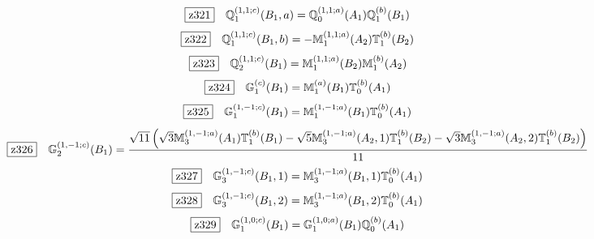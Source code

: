\documentclass[fleqn,10pt,landscape]{jsarticle}
\begin{document}
\begin{dmath*}
\hspace*{3mm}\fbox{z321}\quad \mathbb{Q}_{1}^{(1,1;c)}(B_{1},a)=\mathbb{Q}_{0}^{(1,1;a)}(A_{1}) \mathbb{Q}_{1}^{(b)}(B_{1})
\end{dmath*}
\begin{dmath*}
\hspace*{3mm}\fbox{z322}\quad \mathbb{Q}_{1}^{(1,1;c)}(B_{1},b)=- \mathbb{M}_{1}^{(1,1;a)}(A_{2}) \mathbb{T}_{1}^{(b)}(B_{2})
\end{dmath*}
\begin{dmath*}
\hspace*{3mm}\fbox{z323}\quad \mathbb{Q}_{2}^{(1,1;c)}(B_{1})=\mathbb{M}_{1}^{(1,1;a)}(B_{2}) \mathbb{M}_{1}^{(b)}(A_{2})
\end{dmath*}
\begin{dmath*}
\hspace*{3mm}\fbox{z324}\quad \mathbb{G}_{1}^{(c)}(B_{1})=\mathbb{M}_{1}^{(a)}(B_{1}) \mathbb{T}_{0}^{(b)}(A_{1})
\end{dmath*}
\begin{dmath*}
\hspace*{3mm}\fbox{z325}\quad \mathbb{G}_{1}^{(1,-1;c)}(B_{1})=\mathbb{M}_{1}^{(1,-1;a)}(B_{1}) \mathbb{T}_{0}^{(b)}(A_{1})
\end{dmath*}
\begin{dmath*}
\hspace*{3mm}\fbox{z326}\quad \mathbb{G}_{2}^{(1,-1;c)}(B_{1})=\frac{\sqrt{11} \left(\sqrt{3} \mathbb{M}_{3}^{(1,-1;a)}(A_{1}) \mathbb{T}_{1}^{(b)}(B_{1}) - \sqrt{5} \mathbb{M}_{3}^{(1,-1;a)}(A_{2},1) \mathbb{T}_{1}^{(b)}(B_{2}) - \sqrt{3} \mathbb{M}_{3}^{(1,-1;a)}(A_{2},2) \mathbb{T}_{1}^{(b)}(B_{2})\right)}{11}
\end{dmath*}
\begin{dmath*}
\hspace*{3mm}\fbox{z327}\quad \mathbb{G}_{3}^{(1,-1;c)}(B_{1},1)=\mathbb{M}_{3}^{(1,-1;a)}(B_{1},1) \mathbb{T}_{0}^{(b)}(A_{1})
\end{dmath*}
\begin{dmath*}
\hspace*{3mm}\fbox{z328}\quad \mathbb{G}_{3}^{(1,-1;c)}(B_{1},2)=\mathbb{M}_{3}^{(1,-1;a)}(B_{1},2) \mathbb{T}_{0}^{(b)}(A_{1})
\end{dmath*}
\begin{dmath*}
\hspace*{3mm}\fbox{z329}\quad \mathbb{G}_{1}^{(1,0;c)}(B_{1})=\mathbb{G}_{1}^{(1,0;a)}(B_{1}) \mathbb{Q}_{0}^{(b)}(A_{1})
\end{dmath*}
\end{document}
